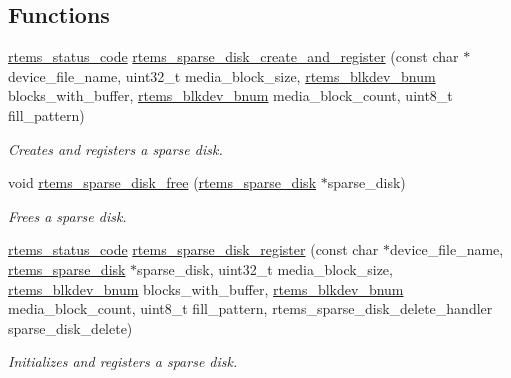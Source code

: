 \subsection*{Functions}
\begin{DoxyCompactItemize}
\item 
\mbox{\hyperlink{group__ClassicStatus_ga545d41846817eaba6143d52ee4d9e9fe}{rtems\+\_\+status\+\_\+code}} \mbox{\hyperlink{group__rtems__sparse__disk_ga520bd068988717a02e0832c115760ef4}{rtems\+\_\+sparse\+\_\+disk\+\_\+create\+\_\+and\+\_\+register}} (const char $\ast$device\+\_\+file\+\_\+name, uint32\+\_\+t media\+\_\+block\+\_\+size, \mbox{\hyperlink{group__rtems__disk_ga5fbcfd40b657bff6c54d9e393fab3274}{rtems\+\_\+blkdev\+\_\+bnum}} blocks\+\_\+with\+\_\+buffer, \mbox{\hyperlink{group__rtems__disk_ga5fbcfd40b657bff6c54d9e393fab3274}{rtems\+\_\+blkdev\+\_\+bnum}} media\+\_\+block\+\_\+count, uint8\+\_\+t fill\+\_\+pattern)
\begin{DoxyCompactList}\small\item\em Creates and registers a sparse disk. \end{DoxyCompactList}\item 
void \mbox{\hyperlink{group__rtems__sparse__disk_gae6a3909209876365980517aa319c7f87}{rtems\+\_\+sparse\+\_\+disk\+\_\+free}} (\mbox{\hyperlink{structrtems__sparse__disk}{rtems\+\_\+sparse\+\_\+disk}} $\ast$sparse\+\_\+disk)
\begin{DoxyCompactList}\small\item\em Frees a sparse disk. \end{DoxyCompactList}\item 
\mbox{\hyperlink{group__ClassicStatus_ga545d41846817eaba6143d52ee4d9e9fe}{rtems\+\_\+status\+\_\+code}} \mbox{\hyperlink{group__rtems__sparse__disk_ga9c0612d8fec13b50359553e5efa15265}{rtems\+\_\+sparse\+\_\+disk\+\_\+register}} (const char $\ast$device\+\_\+file\+\_\+name, \mbox{\hyperlink{structrtems__sparse__disk}{rtems\+\_\+sparse\+\_\+disk}} $\ast$sparse\+\_\+disk, uint32\+\_\+t media\+\_\+block\+\_\+size, \mbox{\hyperlink{group__rtems__disk_ga5fbcfd40b657bff6c54d9e393fab3274}{rtems\+\_\+blkdev\+\_\+bnum}} blocks\+\_\+with\+\_\+buffer, \mbox{\hyperlink{group__rtems__disk_ga5fbcfd40b657bff6c54d9e393fab3274}{rtems\+\_\+blkdev\+\_\+bnum}} media\+\_\+block\+\_\+count, uint8\+\_\+t fill\+\_\+pattern, rtems\+\_\+sparse\+\_\+disk\+\_\+delete\+\_\+handler sparse\+\_\+disk\+\_\+delete)
\begin{DoxyCompactList}\small\item\em Initializes and registers a sparse disk. \end{DoxyCompactList}\end{DoxyCompactItemize}


